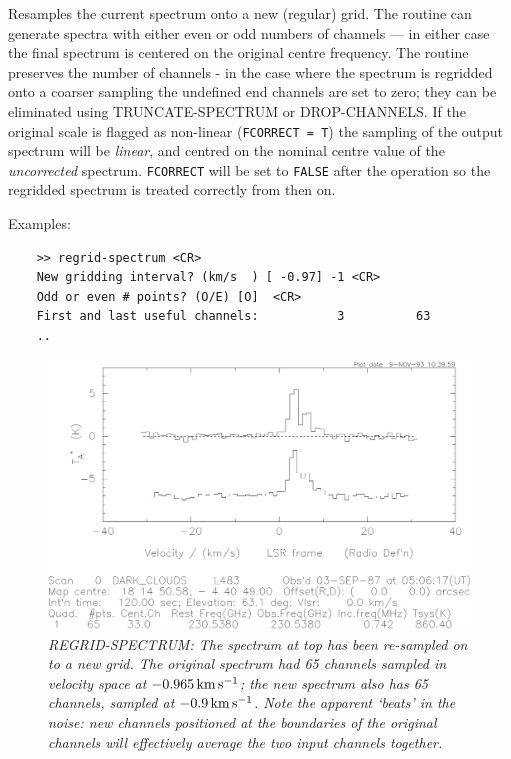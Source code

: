 \documentclass[11pt,twoside]{report}
\newcommand{\kms}{{\rm\,km\,s^{-1}}}
\begin{document}
Resamples  the current spectrum onto a new (regular)
grid. The routine can generate spectra with either even or odd numbers of
channels --- in either case the final spectrum is centered on the original
centre frequency. The routine preserves the number of channels - in the case
where the spectrum is regridded onto a coarser sampling the undefined end
channels are set to zero; they can be eliminated using TRUNCATE-SPECTRUM or
DROP-CHANNELS.   If the original
scale is flagged as non-linear (\verb+FCORRECT = T+) 
the sampling of the output spectrum will be {\em linear}, and centred on the
nominal centre value of the {\em uncorrected} spectrum. \verb+FCORRECT+ will be
set to \verb+FALSE+ after the operation so the regridded spectrum is treated
correctly from then on. 

Examples:
\begin{verbatim}
    >> regrid-spectrum <CR>
    New gridding interval? (km/s  ) [ -0.97] -1 <CR>
    Odd or even # points? (O/E) [O]  <CR>
    First and last useful channels:           3          63
    ..
\end{verbatim}

\begin{figure}[htbp]
\begin{center}
\includegraphics[scale=0.65]{regrid.ps}
\protect\parbox{5.5in}
{\caption[REGRID]
{\sl
REGRID-SPECTRUM: The spectrum at top has been re-sampled on to a new grid. The
original spectrum had 65 channels sampled in velocity space at $-0.965 \kms$;
the new spectrum also has 65 channels, sampled at $-0.9\kms$. Note the 
apparent `beats' in the noise: new channels positioned at the boundaries of
the original channels will effectively average the two input channels together.
\label{REGRID}
}
}
\end{center}
\end{figure}
\end{document}
